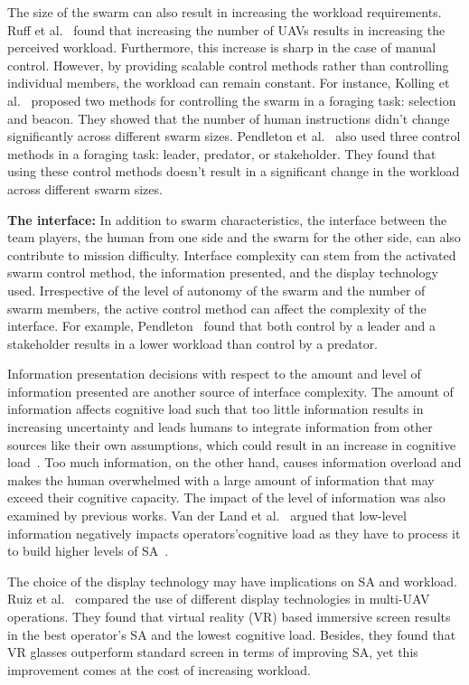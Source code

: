\documentclass[journal]{IEEEtran}
\begin{document}
The size of the swarm can also result in increasing the workload requirements. Ruff et al.~\cite{ruff2002} found that increasing the number of UAVs results in increasing the perceived workload. Furthermore, this increase is sharp in the case of manual control. However, by providing scalable control methods rather than controlling individual members, the workload can remain constant. For instance, Kolling et al.~\cite{towards} proposed two methods for controlling the swarm in a foraging task: selection and beacon. They showed that the number of human instructions didn\textquoteright t change significantly across different swarm sizes. Pendleton et al.~\cite{scalableHSI} also used three control methods in a foraging task: leader, predator, or stakeholder. They found that using these control methods doesn\textquoteright t result in a significant change in the workload across different swarm sizes.

\textbf{The interface: }
In addition to swarm characteristics, the interface between the team players, the human from one side and the swarm for the other side, can also contribute to mission difficulty. Interface complexity can stem from the activated swarm control method, the information presented, and the display technology used. Irrespective of the level of autonomy of the swarm and the number of swarm members, the active control method can affect the complexity of the interface. For example, Pendleton~\cite{scalableHSI} found that both control by a leader and a stakeholder results in a lower workload than control by a predator. 

Information presentation decisions with respect to the amount  and level of information presented are another source of interface complexity. The amount of information affects cognitive load such that too little information results in increasing uncertainty and leads humans to integrate information from other sources like their own assumptions, which could result in an increase in cognitive load~\cite{lost}. Too much information, on the other hand, causes information overload and makes the human overwhelmed with a large amount of information that may exceed their cognitive capacity. The impact of the level of information was also examined by previous works. Van der Land et al.~\cite{SAChapter} argued that low-level information negatively impacts operators\textquoteright  cognitive load as they have to process it to build higher levels of SA~\cite{SAPerformance}. 

The choice of the display technology may have implications on SA and workload. Ruiz et al.~\cite{immersive} compared the use of different display technologies in multi-UAV operations. They found that virtual reality (VR) based immersive screen results in the best operator\textquoteright s SA and the lowest cognitive load. Besides, they found that VR glasses outperform standard screen in terms of improving SA, yet this improvement comes at the cost of increasing workload.
\end{document}
